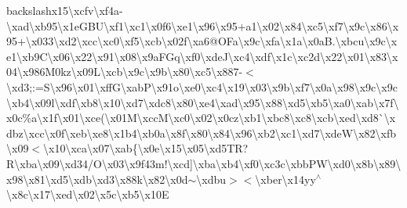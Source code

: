 \begin{DoxyCompactItemize}
backslash{}x15\textbackslash{}xcfv\textbackslash{}xf4a-\/\textbackslash{}xad\textbackslash{}xb95\textbackslash{}x1e\+G\+B\+U\textbackslash{}xf1\textbackslash{}xc1\textbackslash{}x0f6\textbackslash{}xe1\textbackslash{}x96\textbackslash{}x95+a1\textbackslash{}x02\textbackslash{}x84\textbackslash{}xc5\textbackslash{}xf7\textbackslash{}x9c\textbackslash{}x86\textbackslash{}x95+\textbackslash{}x033\textbackslash{}xd2\textbackslash{}xcc\textbackslash{}xc0\textbackslash{}xf5\textquotesingle{}\textbackslash{}xcb\textbackslash{}x02f\textbackslash{}xa6@\+O\+Fa\textbackslash{}x9c\textbackslash{}xfa\textbackslash{}x1a\textbackslash{}x0a\+B.\textbackslash{}xbcu\textbackslash{}x9c\textbackslash{}xe1\textbackslash{}xb9\+C\textbackslash{}x06\textbackslash{}x22\textbackslash{}x91\textbackslash{}x08\textbackslash{}x9a\+F\+Gq\textbackslash{}xf0\textbackslash{}xde\+J\textbackslash{}xc4\textbackslash{}xdf\textbackslash{}x1c\textbackslash{}xc2d\textbackslash{}x22\textbackslash{}x01\textbackslash{}x83\textbackslash{}x04\textbackslash{}x986\+M0kz\textbackslash{}x09\+L\textbackslash{}xcb\textbackslash{}x9c\textbackslash{}x9b\textbackslash{}x80\textbackslash{}xc5\textbackslash{}x887-\/$<$\textbackslash{}xd3;\+:=\+S\textbackslash{}x96\textbackslash{}x01\textbackslash{}xff\+G\textbackslash{}xab\+P\textbackslash{}x91o\textbackslash{}xe0\textbackslash{}xc4\textbackslash{}x19\textbackslash{}x03\textbackslash{}x9b\textbackslash{}xf7\textbackslash{}x0a\textbackslash{}x98\textbackslash{}x9c\textbackslash{}x9c\textbackslash{}xb4\textbackslash{}x09l\textbackslash{}xdf\textbackslash{}xb8\textbackslash{}x10\textbackslash{}xd7\textbackslash{}xdc8\textbackslash{}x80\textbackslash{}xe4\textbackslash{}xad\textbackslash{}x95\textbackslash{}x88\textbackslash{}xd5\textbackslash{}xb5\textbackslash{}xa0\textbackslash{}xab\textbackslash{}x7f\textbackslash{}x0c\%a\textbackslash{}x1f\textbackslash{}x01\textbackslash{}xce(\textbackslash{}x01\+M\textbackslash{}xcc\+M\textbackslash{}xc0\textbackslash{}x02\textbackslash{}x0cz\textbackslash{}xb1\textbackslash{}xbc8\textbackslash{}xc8\textbackslash{}xcb\textbackslash{}xed\textbackslash{}xd8\`{}\textbackslash{}xdbz\textbackslash{}xcc\textbackslash{}x0f\textbackslash{}xeb\textbackslash{}xe8\textbackslash{}x1b4\textbackslash{}xb0a\textbackslash{}x8f\textbackslash{}x80\textbackslash{}x84\textbackslash{}x96\textbackslash{}xb2\textbackslash{}xc1\textbackslash{}xd7\textbackslash{}xde\+W\textbackslash{}x82\textbackslash{}xfb\textbackslash{}x09$<$\textbackslash{}x10\textbackslash{}xca\textbackslash{}x07\textbackslash{}xab\{\textbackslash{}x0e\textbackslash{}x15\textbackslash{}x05\textbackslash{}xd5\+T\+R?\+R\textbackslash{}xba\textbackslash{}x09\textbackslash{}xd34/\+O\textbackslash{}x03\textbackslash{}x9f43m!\textbackslash{}xcd\mbox{]}\textbackslash{}xba\textbackslash{}xb4\textbackslash{}xf0\textbackslash{}xc3c\textbackslash{}xbb\+P\+W\textbackslash{}xd0\textbackslash{}x8b\textbackslash{}x89\textbackslash{}x98\textbackslash{}x81\textbackslash{}xd5\textbackslash{}xdb\textbackslash{}xd3\textbackslash{}x88k\textbackslash{}x82\textbackslash{}x0d$\sim$\textbackslash{}xdbu$>$$<$\textbackslash{}xber\textbackslash{}x14yy$^\wedge$\textbackslash{}x8c\textbackslash{}x17\textbackslash{}xed\textbackslash{}x02\textbackslash{}x5c\textbackslash{}xb5\textbackslash{}x10\+E\textba
\end{DoxyCompactItemize}
